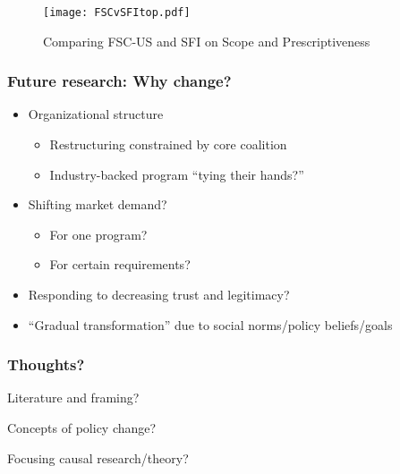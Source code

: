 \documentclass[10pt]{beamer}
\begin{document}
\begin{frame}
\begin{figure}[h!]
\centering
\label{sfi}
\caption{Comparing FSC-US and SFI on Scope and Prescriptiveness}
\texttt{[image: FSCvSFItop.pdf]}
\end{figure}
\end{frame}


\begin{frame}
\frametitle{Future research: Why change?}
\begin{itemize}
	\item Organizational structure \begin{itemize}
      \item Restructuring constrained by core coalition
      \item Industry-backed program ``tying their hands?''
      \end{itemize} \pause
     \item Shifting market demand? \begin{itemize}
     	\item For one program?
        \item For certain requirements?
     \end{itemize} \pause
     \item Responding to decreasing trust and legitimacy? \pause
     \item ``Gradual transformation'' due to social norms/policy beliefs/goals 
\end{itemize}
\end{frame}

\begin{frame}
\frametitle{Thoughts?}
Literature and framing? 

\bigskip

Concepts of policy change?

\bigskip

Focusing causal research/theory?
\end{frame}
\end{document}
